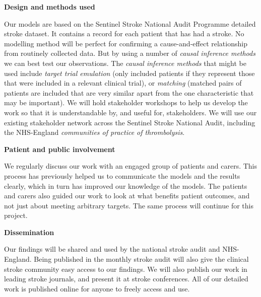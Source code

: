 \textbf{Design and methods used}

Our models are based on the Sentinel Stroke National Audit Programme detailed stroke dataset. It contains a record for each patient that has had a stroke. No modelling method will be perfect for confirming a cause-and-effect relationship from routinely collected data. But by using a number of \textit{causal inference methods} we can best test our observations. The \textit{causal inference methods} that might be used include \textit{target trial emulation} (only included patients if they represent those that were included in a relevant clinical trial), or \textit{matching} (matched pairs of patients are included that are very similar apart from the one characteristic that may be important). We will hold stakeholder workshops to help us develop the work so that it is understandable by, and useful for, stakeholders. We will use our existing stakeholder network across the Sentinel Stroke National Audit, including the NHS-England \textit{communities of practice of thrombolysis}.

\textbf{Patient and public involvement}

We regularly discuss our work with an engaged group of patients and carers. This process has previously helped us to communicate the models and the results clearly, which in turn has improved our knowledge of the models. The patients and carers also guided our work to look at what benefits patient outcomes, and not just about meeting arbitrary targets. The same process will continue for this project.

\textbf{Dissemination}

Our findings will be shared and used by the national stroke audit and NHS-England. Being published in the monthly stroke audit will also give the clinical stroke community easy access to our findings. We will also publish our work in leading stroke journals, and present it at stroke conferences. All of our detailed work is published online for anyone to freely access and use.